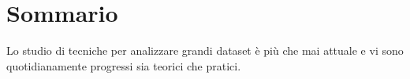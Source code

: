 \begingroup
\let\clearpage\relax
\let\cleardoublepage\relax
\let\cleardoublepage\relax

\chapter*{Sommario}

Lo studio di tecniche per analizzare grandi dataset è più che mai attuale e vi sono quotidianamente progressi sia teorici che pratici.

\vfill

\endgroup

\vfill
